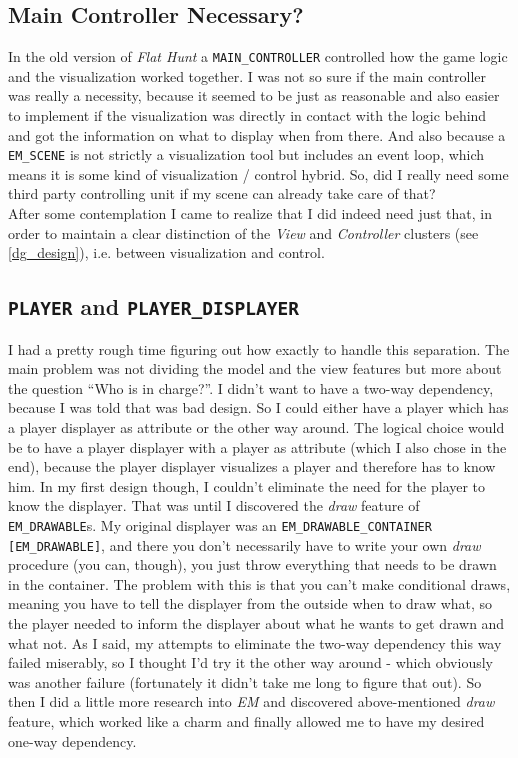 \subsection{Main Controller Necessary?}
In the old version of \emph{Flat Hunt} a \texttt{MAIN\_CONTROLLER} controlled how the game logic and the visualization worked together. I was not so sure if the main controller was really a necessity, because it seemed to be just as reasonable and also easier to implement if the visualization was directly in contact with the logic behind and got the information on what to display when from there. And also because a \texttt{EM\_SCENE} is not strictly a visualization tool but includes an event loop, which means it is some kind of visualization / control hybrid. So, did I really need some third party controlling unit if my scene can already take care of that?\\
After some contemplation I came to realize that I did indeed need just that, in order to maintain a clear distinction of the \emph{View} and \emph{Controller} clusters (see \autoref{dg_design}), i.e. between visualization and control. 

\subsection{\texttt{PLAYER} and \texttt{PLAYER\_DISPLAYER}}
I had a pretty rough time figuring out how exactly to handle this separation. The main problem was not dividing the model and the view features but more about the question ``Who is in charge?''. I didn't want to have a two-way dependency, because I was told that was bad design. So I could either have a player which has a player displayer as attribute or the other way around. The logical choice would be to have a player displayer with a player as attribute (which I also chose in the end), because the player displayer visualizes a player and therefore has to know him. In my first design though, I couldn't eliminate the need for the player to know the displayer. That was until I discovered the \textit{draw} feature of \texttt{EM\_DRAWABLE}s. My original displayer was an \texttt{EM\_DRAWABLE\_CONTAINER [EM\_DRAWABLE]}, and there you don't necessarily have to write your own \textit{draw} procedure (you can, though), you just throw everything that needs to be drawn in the container. The problem with this is that you can't make conditional draws, meaning you have to tell the displayer from the outside when to draw what, so the player needed to inform the displayer about what he wants to get drawn and what not. As I said, my attempts to eliminate the two-way dependency this way failed miserably, so I thought I'd try it the other way around - which obviously was another failure (fortunately it didn't take me long to figure that out). So then I did a little more research into \emph{EM} and discovered above-mentioned \textit{draw} feature, which worked like a charm and finally allowed me to have my desired one-way dependency.

